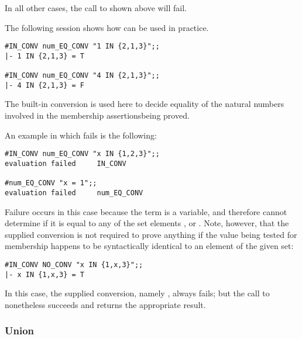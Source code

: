 \noindent In all other cases, the call to  shown above will fail.

The following session shows how  can be used in practice.

\setcounter{sessioncount}{1}
\begin{session}
\begin{verbatim}
#IN_CONV num_EQ_CONV "1 IN {2,1,3}";;
|- 1 IN {2,1,3} = T

#IN_CONV num_EQ_CONV "4 IN {2,1,3}";;
|- 4 IN {2,1,3} = F
\end{verbatim}\end{session}

\noindent The built-in conversion  is used here to decide
equality of the natural numbers involved in the membership
assertions\pagebreak[3] being proved.

An example in which  fails is the following:

\begin{session}
\begin{verbatim}
#IN_CONV num_EQ_CONV "x IN {1,2,3}";;
evaluation failed     IN_CONV

#num_EQ_CONV "x = 1";;
evaluation failed     num_EQ_CONV
\end{verbatim}\end{session}

\noindent Failure occurs in this case because the term  is a variable,
and  therefore cannot determine if it is equal to any of the
set elements ,  or .  Note, however, that the supplied
conversion is not required to prove anything if the value being tested for
membership happens to be syntactically identical to an element of the given
set:

\begin{session}
\begin{verbatim}
#IN_CONV NO_CONV "x IN {1,x,3}";;
|- x IN {1,x,3} = T
\end{verbatim}\end{session}

\noindent In this case, the supplied conversion, namely , always
fails; but the call to  nonetheless succeeds and returns the
appropriate result.%

\subsubsection{Union}

